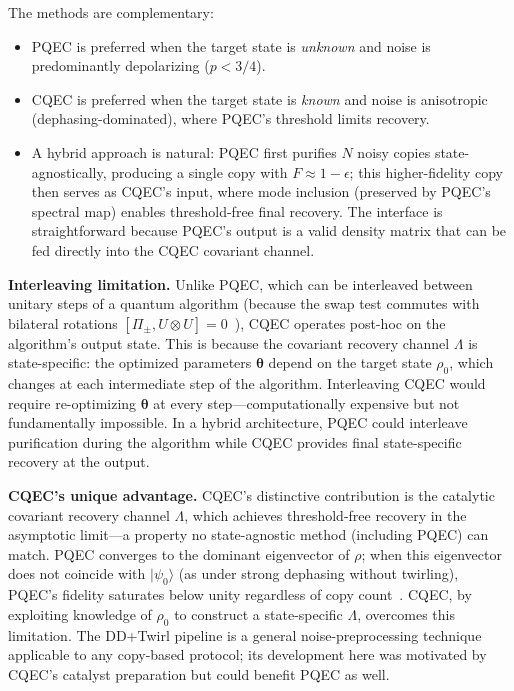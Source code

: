\documentclass[pra,twocolumn,superscriptaddress,longbibliography,floatfix]{revtex4-2}
\begin{document}
The methods are complementary:
\begin{itemize}
\item PQEC is preferred when the target state is \emph{unknown} and noise is predominantly depolarizing ($p < 3/4$).
\item CQEC is preferred when the target state is \emph{known} and noise is anisotropic (dephasing-dominated), where PQEC's threshold limits recovery.
\item A hybrid approach is natural: PQEC first purifies $N$ noisy copies state-agnostically, producing a single copy with $F \approx 1 - \epsilon$; this higher-fidelity copy then serves as CQEC's input, where mode inclusion (preserved by PQEC's spectral map) enables threshold-free final recovery.
The interface is straightforward because PQEC's output is a valid density matrix that can be fed directly into the CQEC covariant channel.
\end{itemize}

\textbf{Interleaving limitation.}
Unlike PQEC, which can be interleaved between unitary steps of a quantum algorithm (because the swap test commutes with bilateral rotations $[\Pi_\pm, U \otimes U] = 0$~\cite{Raghoonanan2026}), CQEC operates post-hoc on the algorithm's output state.
This is because the covariant recovery channel $\Lambda$ is state-specific: the optimized parameters $\boldsymbol{\theta}$ depend on the target state $\rho_0$, which changes at each intermediate step of the algorithm.
Interleaving CQEC would require re-optimizing $\boldsymbol{\theta}$ at every step---computationally expensive but not fundamentally impossible.
In a hybrid architecture, PQEC could interleave purification during the algorithm while CQEC provides final state-specific recovery at the output.

\textbf{CQEC's unique advantage.}
CQEC's distinctive contribution is the catalytic covariant recovery channel $\Lambda$, which achieves threshold-free recovery in the asymptotic limit---a property no state-agnostic method (including PQEC) can match.
PQEC converges to the dominant eigenvector of $\rho$; when this eigenvector does not coincide with $|\psi_0\rangle$ (as under strong dephasing without twirling), PQEC's fidelity saturates below unity regardless of copy count~\cite{Raghoonanan2026}.
CQEC, by exploiting knowledge of $\rho_0$ to construct a state-specific $\Lambda$, overcomes this limitation.
The DD+Twirl pipeline is a general noise-preprocessing technique applicable to any copy-based protocol; its development here was motivated by CQEC's catalyst preparation but could benefit PQEC as well.
\end{document}
